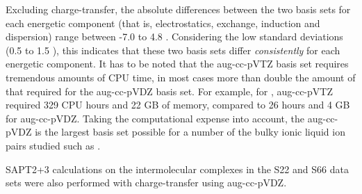 Excluding charge-transfer, the absolute differences between the two basis sets for each energetic component (that is, electrostatics, exchange, induction and dispersion) range between -7.0 to 4.8 \enUnit.
Considering the low standard deviations  (0.5 to 1.5 \enUnit), this indicates that these two basis sets differ \emph{consistently} for each energetic component. 
It has to be noted that the aug-cc-pVTZ basis set requires tremendous amounts of CPU time, in most cases more than double the amount of that required for the aug-cc-pVDZ basis set.
For example, for , aug-cc-pVTZ required 329 CPU hours and 22 GB of memory, compared to 26  hours and 4 GB for aug-cc-pVDZ. Taking the computational expense into account, the aug-cc-pVDZ is the largest basis set possible for a number of the bulky ionic liquid ion pairs studied such as .

SAPT2+3 calculations on the intermolecular complexes in the S22 and S66 data sets were also performed with charge-transfer using aug-cc-pVDZ.
\cite{Jurecka2006a, Takatani2010a, Rezac2011a}




